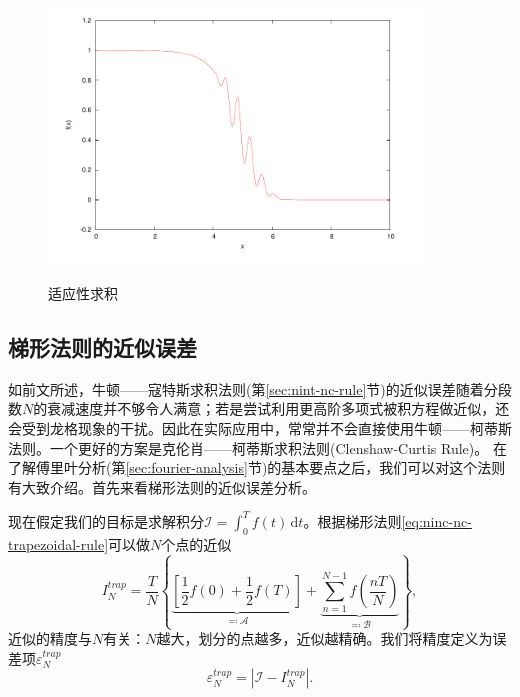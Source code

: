 \begin{figure}[htbp]
   \caption{适应性求积}
  \centering
  \includegraphics[width=10cm]{./Figures/20170227-nc-adaptive-quadrature.png}
  \label{fig:ninc-nc-singularity-adaptive-quadrature}
%
\end{figure}

\subsection{梯形法则的近似误差}
\label{sec:ninc-cc-trapezoidal-error}

如前文所述，牛顿——寇特斯求积法则(第\ref{sec:nint-nc-rule}节)的近似误差随着分段数$N$的衰减速度并不够令人满意；若是尝试利用更高阶多项式被积方程做近似，还会受到龙格现象的干扰。因此在实际应用中，常常并不会直接使用牛顿——柯蒂斯法则。一个更好的方案是克伦肖——柯蒂斯求积法则(Clenshaw-Curtis Rule)。
在了解傅里叶分析(第\ref{sec:fourier-analysis}节)的基本要点之后，我们可以对这个法则有大致介绍。首先来看梯形法则的近似误差分析。


现在假定我们的目标是求解积分$\mathcal{I} = \int_{0}^{T} f(t) \, \mathrm{d} t$。根据梯形法则\eqref{eq:ninc-nc-trapezoidal-rule}可以做$N$个点的近似
\begin{equation}
  \label{eq:ninc-cc-trape-approx}
  I_{N}^{trap} = \frac{T}{N}
  \left\{
  \underbrace{
  \left[ \frac{1}{2} f(0) + \frac{1}{2} f(T) \right]
  }_{\eqqcolon \mathcal{A}}
  + \underbrace{
  \sum_{n=1}^{N-1} f \left( \frac{n T}{N} \right)
  }_{\eqqcolon \mathcal{B}}
  \right\},
\end{equation}
近似的精度与$N$有关：$N$越大，划分的点越多，近似越精确。我们将精度定义为误差项$\varepsilon_{N}^{trap}$
\begin{equation*}
  \varepsilon_{N}^{trap} = \left| \mathcal{I} - I_{N}^{trap} \right|.
\end{equation*}

